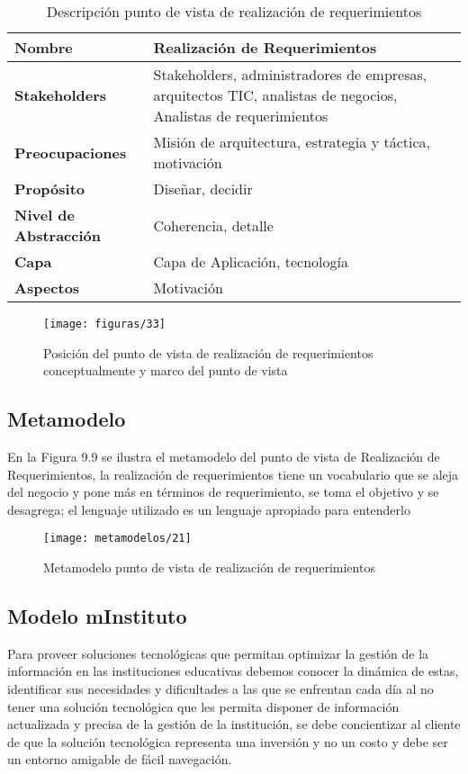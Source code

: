    \begin{table}[H]
   	\centering
   	\begin{tabular}{lp{8cm}}
   		\toprule
   		\textbf{Nombre} & \textbf{Realización de Requerimientos} \\
   		\midrule
   		\textbf{Stakeholders} & Stakeholders, administradores de empresas, arquitectos TIC, analistas de negocios, Analistas de requerimientos \\
   		\textbf{Preocupaciones} & Misión de arquitectura, estrategia y táctica, motivación \\
   		\textbf{Propósito} & Diseñar, decidir \\
   		\textbf{Nivel de Abstracción} & Coherencia, detalle \\
   		\textbf{Capa} & Capa de Aplicación, tecnología \\
   		\textbf{Aspectos} & Motivación \\
   		\bottomrule
   	\end{tabular}
   	\captionsetup{width=.95\textwidth}
   	\caption{Descripción punto de vista de realización de requerimientos}
   	\label{tabla24}
   \end{table}
   
   \begin{figure}[H]
   	\centering
   	\texttt{[image: figuras/33]}
   	\captionsetup{width=.95\textwidth}
   	\caption{Posición del punto de vista de realización de requerimientos conceptualmente y marco del punto de vista}
   	\label{figura33}
   \end{figure}
   
   \subsection{Metamodelo}
   En la Figura 9.9 se ilustra el metamodelo del punto de vista de Realización de Requerimientos, la realización de requerimientos tiene un vocabulario que se aleja del negocio y pone más en términos de requerimiento, se toma el objetivo y se desagrega; el lenguaje utilizado es un lenguaje apropiado para entenderlo
   
   \begin{figure}[H]
   	\centering
   	\texttt{[image: metamodelos/21]}
   	\captionsetup{width=.95\textwidth}
   	\caption{Metamodelo punto de vista de realización de requerimientos}
   	\label{metamodelo21}
   \end{figure}
   
   \subsection{Modelo mInstituto}
   Para proveer soluciones tecnológicas que permitan optimizar la gestión de la información en las instituciones educativas debemos conocer la dinámica de estas, identificar sus necesidades y dificultades a las que se enfrentan cada día al no tener una solución tecnológica que les permita disponer de información actualizada y precisa de la gestión de la institución, se debe concientizar al cliente de que la solución tecnológica representa una inversión y no un costo y debe ser un entorno amigable de fácil navegación. \\
   
